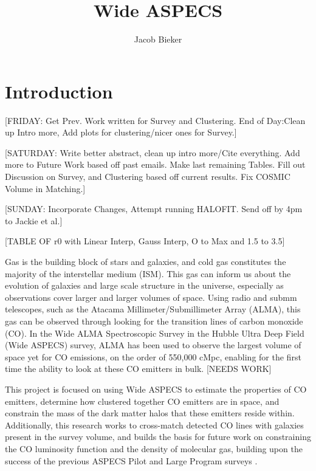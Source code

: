 \documentclass[twoside,single]{lion-msc}
\title{Wide ASPECS}
\author{Jacob Bieker}
\affiliation{Leiden Observatory, Leiden University}
\begin{document}
\maketitle

\setcounter{page}{2}
\tableofcontents
\cleardoublepage

\setcounter{page}{1}
\chapter{Introduction}

[FRIDAY: Get Prev. Work written for Survey and Clustering. End of Day:Clean up Intro more, Add plots for clustering/nicer ones for Survey.]

[SATURDAY: Write better abstract, clean up intro more/Cite everything. Add more to Future Work based off past emails. Make last remaining Tables. Fill out Discussion on Survey, and Clustering based off current results. Fix COSMIC Volume in Matching.]

[SUNDAY: Incorporate Changes, Attempt running HALOFIT. Send off by 4pm to Jackie et al.] 

[TABLE OF r0 with Linear Interp, Gauss Interp, O to Max and 1.5 to 3.5]

Gas is the building block of stars and galaxies, and cold gas constitutes the majority of the interstellar medium (ISM). This gas can inform us about the evolution of galaxies and large scale structure in the universe, especially as observations cover larger and larger volumes of space. Using radio and submm telescopes, such as the Atacama Millimeter/Submillimeter Array (ALMA), this gas can be observed through looking for the transition lines of carbon monoxide (CO). In the Wide ALMA Spectroscopic Survey in the Hubble Ultra Deep Field (Wide ASPECS) survey, ALMA has been used to observe the largest volume of space yet for CO emissions, on the order of 550,000 cMpc, enabling for the first time the ability to look at these CO emitters in bulk. [NEEDS WORK]

This project is focused on using Wide ASPECS to estimate the properties of CO emitters, determine how clustered together CO emitters are in space, and constrain the mass of the dark matter halos that these emitters reside within. Additionally, this research works to cross-match detected CO lines with galaxies present in the survey volume, and builds the basis for future work on constraining the CO luminosity function and the density of molecular gas, building upon the success of the previous ASPECS Pilot and Large Program surveys \cite{walter2016alma, decarli2019alma}. 
\end{document}
